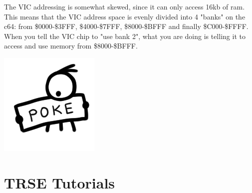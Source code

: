 \begin{minipage}{0.8\textwidth}
The VIC addressing is somewhat skewed, since it can only access 16kb of ram. This means that the VIC address space is evenly divided into 4 "banks" on the c64: from \$0000-\$3FFF, \$4000-\$7FFF, \$8000-\$BFFF and finally \$C000-\$FFFF. When you tell the VIC chip to "use bank 2", what you are doing is telling it to access and use memory from \$8000-\$BFFF.
\end{minipage}
\begin{minipage}{0.2\textwidth}
\includegraphics[width=\linewidth]{images/trip/trip7.png}
\end{minipage}


\section{TRSE Tutorials}






